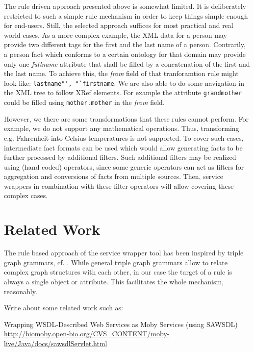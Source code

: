 \documentclass{fast_latex}
\begin{document}
The rule driven approach presented above is somewhat limited. It is deliberately restricted to such a simple rule mechanism in order to keep things simple enough for end-users. Still, the selected approach suffices for most practical and real world cases. As a more complex example, the XML data for a person may provide two different tags for the first and the last name of a person. Contrarily, a person fact which conforms to a certain ontology for that domain may provide only one \emph{fullname} attribute that shall be filled by a concatenation of the first and the last name. To achieve this, the \textit{from} field of that tranforamtion rule might look like: \texttt{lastname"', "`firstname}. We are also able to do some navigation in the XML tree to follow XRef elements. For example the attribute \texttt{grandmother} could be filled using \texttt{mother.mother} in the \textit{from} field. 

However, we there are some transformations that these rules cannot perform. For example, we do not support any mathematical operations. Thus, transforming e.g. Fahrenheit into Celsius temperatures is not supported. To cover such  cases, intermediate fact formats can be used which would allow generating facts to be further processed by additional filters. Such additional filters may be realized using (hand coded) operators, since some generic operators can act as filters for aggregation and conversions of facts from multiple sources. Then, service wrappers in combination with these filter operators will allow covering these complex cases.



\clearpage
\section{Related Work} %
\label{sec:related_work}

The rule based approach of the service wrapper tool has been inspired by triple graph grammars, cf. \cite{Schurr94,JSZ97c}. While general triple graph grammars allow to relate complex graph structures with each other, in our case the target of a rule is always a single object or attribute. This facilitates the whole mechanism, reasonably. 

Write about some related work such as:

Wrapping WSDL-Described Web Services as Moby Services (using SAWSDL)
\url{http://biomoby.open-bio.org/CVS_CONTENT/moby-live/Java/docs/sawsdlServlet.html}
\end{document}
